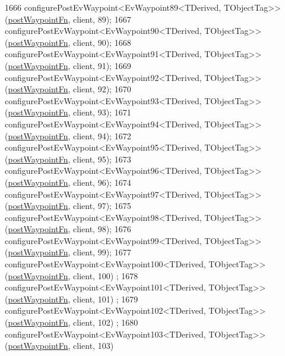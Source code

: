 \begin{DoxyCode}
1666     configurePostEvWaypoint<EvWaypoint89<TDerived, TObjectTag>>(\hyperlink{classsmacc_1_1WaypointEventDispatcher_a6bccf6a93a827634b7b5e67ac0e4ec57}{postWaypointFn}, client, 89);
1667     configurePostEvWaypoint<EvWaypoint90<TDerived, TObjectTag>>(\hyperlink{classsmacc_1_1WaypointEventDispatcher_a6bccf6a93a827634b7b5e67ac0e4ec57}{postWaypointFn}, client, 90);
1668     configurePostEvWaypoint<EvWaypoint91<TDerived, TObjectTag>>(\hyperlink{classsmacc_1_1WaypointEventDispatcher_a6bccf6a93a827634b7b5e67ac0e4ec57}{postWaypointFn}, client, 91);
1669     configurePostEvWaypoint<EvWaypoint92<TDerived, TObjectTag>>(\hyperlink{classsmacc_1_1WaypointEventDispatcher_a6bccf6a93a827634b7b5e67ac0e4ec57}{postWaypointFn}, client, 92);
1670     configurePostEvWaypoint<EvWaypoint93<TDerived, TObjectTag>>(\hyperlink{classsmacc_1_1WaypointEventDispatcher_a6bccf6a93a827634b7b5e67ac0e4ec57}{postWaypointFn}, client, 93);
1671     configurePostEvWaypoint<EvWaypoint94<TDerived, TObjectTag>>(\hyperlink{classsmacc_1_1WaypointEventDispatcher_a6bccf6a93a827634b7b5e67ac0e4ec57}{postWaypointFn}, client, 94);
1672     configurePostEvWaypoint<EvWaypoint95<TDerived, TObjectTag>>(\hyperlink{classsmacc_1_1WaypointEventDispatcher_a6bccf6a93a827634b7b5e67ac0e4ec57}{postWaypointFn}, client, 95);
1673     configurePostEvWaypoint<EvWaypoint96<TDerived, TObjectTag>>(\hyperlink{classsmacc_1_1WaypointEventDispatcher_a6bccf6a93a827634b7b5e67ac0e4ec57}{postWaypointFn}, client, 96);
1674     configurePostEvWaypoint<EvWaypoint97<TDerived, TObjectTag>>(\hyperlink{classsmacc_1_1WaypointEventDispatcher_a6bccf6a93a827634b7b5e67ac0e4ec57}{postWaypointFn}, client, 97);
1675     configurePostEvWaypoint<EvWaypoint98<TDerived, TObjectTag>>(\hyperlink{classsmacc_1_1WaypointEventDispatcher_a6bccf6a93a827634b7b5e67ac0e4ec57}{postWaypointFn}, client, 98);
1676     configurePostEvWaypoint<EvWaypoint99<TDerived, TObjectTag>>(\hyperlink{classsmacc_1_1WaypointEventDispatcher_a6bccf6a93a827634b7b5e67ac0e4ec57}{postWaypointFn}, client, 99);
1677     configurePostEvWaypoint<EvWaypoint100<TDerived, TObjectTag>>(\hyperlink{classsmacc_1_1WaypointEventDispatcher_a6bccf6a93a827634b7b5e67ac0e4ec57}{postWaypointFn}, client, 100)
      ;
1678     configurePostEvWaypoint<EvWaypoint101<TDerived, TObjectTag>>(\hyperlink{classsmacc_1_1WaypointEventDispatcher_a6bccf6a93a827634b7b5e67ac0e4ec57}{postWaypointFn}, client, 101)
      ;
1679     configurePostEvWaypoint<EvWaypoint102<TDerived, TObjectTag>>(\hyperlink{classsmacc_1_1WaypointEventDispatcher_a6bccf6a93a827634b7b5e67ac0e4ec57}{postWaypointFn}, client, 102)
      ;
1680     configurePostEvWaypoint<EvWaypoint103<TDerived, TObjectTag>>(\hyperlink{classsmacc_1_1WaypointEventDispatcher_a6bccf6a93a827634b7b5e67ac0e4ec57}{postWaypointFn}, client, 103)

\end{DoxyCode}
